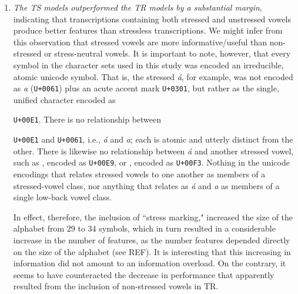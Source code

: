 \begin{enumerate}
\item \emph{The TS models outperformed the TR models by a substantial margin}, indicating that transcriptions containing both stressed and unstressed vowels produce better features than stressless transcriptions. We might infer from this observation that stressed vowels are more informative/useful than non-stressed or stress-neutral vowels. It is important to note, however, that every symbol in the character sets used in this study was encoded an irreducible, atomic unicode symbol. That is, the stressed \textit{\'a}, for example, was not encoded as \textit{a} (\texttt{U+0061}) plus an acute accent mark \texttt{U+0301}, but rather as the single, unified character encoded as {\texttt{U+00E1}. There is no relationship between {\texttt{U+00E1} and \texttt{U+0061}, i.e., \textit{\'a} and \textit{a}; each is atomic and utterly distinct from the other. There is likewise no relationship between \textit{\'a} and another stressed vowel, such as , encoded as \texttt{U+00E9}, or , encoded as \texttt{U+00F3}. Nothing in the unicode encodings that relates stressed vowels to one another as members of a stressed-vowel class, nor anything that relates as \textit{\'a} and \textit{a} as members of a single low-back vowel class.

In effect, therefore, the inclusion of ``stress marking," increased the size of the alphabet from 29 to 34 symbols, which
in turn resulted in a considerable increase in the number of features, as the number features depended 
directly on the size of the alphabet (see REF). It is interesting that this increasing in information did not 
amount to an information overload. On the contrary, it seems to have counteracted the decrease in 
performance that apparently resulted from the inclusion of non-stressed vowels in TR. %

%











}}
\end{enumerate}
